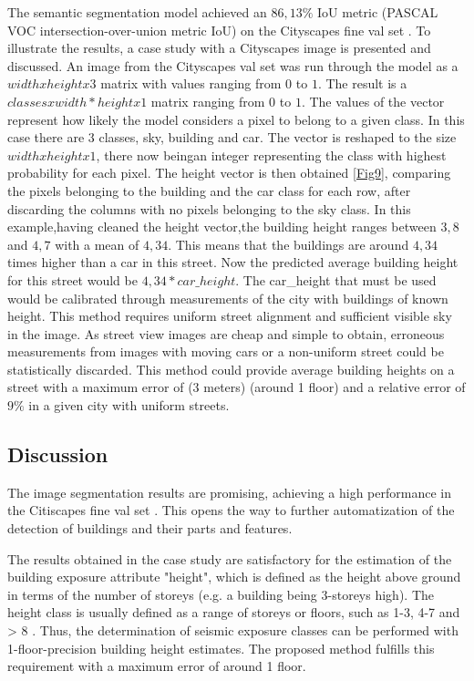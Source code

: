 \documentclass[journal,article,submit,pdftex,moreauthors]{Definitions/mdpi}
\begin{document}
The semantic segmentation model achieved an \(86,13 \% \) IoU metric (PASCAL VOC intersection-over-union metric IoU) on the Cityscapes fine val set \cite{Cordts2016TheUnderstanding}. To illustrate the results, a case study with a Cityscapes image is presented and discussed. An image from the Cityscapes val set was run through the model as a \(widthxheightx3\) matrix with values ranging from \(0\) to \(1\). The result is a \(classesxwidth*heightx1\)  matrix ranging from \(0\) to \(1\). The values of the vector represent how likely the model considers a pixel to belong to a given class. In this case there are \(3\) classes, sky, building and car. The vector is reshaped to the size \(widthxheightx1\), there now beingan integer representing the class with highest probability for each pixel. The height vector is then obtained \ref{Fig9}, comparing the pixels belonging to the building and the car class for each row, after discarding the columns with no pixels belonging to the sky class. In this example,having cleaned the height vector,the building height ranges between \(3,8\) and \(4,7\) with a mean of \(4,34\). This means that the buildings are around \(4,34\) times higher than a car in this street. Now the predicted average building height for this street would be \(4,34 * car\_height \). The car\_height that must be used would be calibrated through measurements of the city with buildings of known height. This method requires uniform street alignment and sufficient visible sky in the image. As street view images are cheap and simple to obtain, erroneous measurements from images with moving cars or a non-uniform street could be statistically discarded. This method could provide average building heights on a street with a maximum error of (\(3\) meters) (around 1 floor) and a relative error of \(9\%\) in a given city with uniform streets.

\subsection{Discussion}

The image segmentation results are promising, achieving a high performance in the Citiscapes fine val set \cite{Cordts2016TheUnderstanding}. This opens the way to further automatization of the detection of buildings and their parts and features.

The results obtained in the case study are satisfactory for the estimation of the building exposure attribute "height", which is defined as the height above ground in terms of the number of storeys (e.g. a building being 3-storeys high). The height class is usually defined as a range of storeys or floors, such as 1-3, 4-7 and > 8 \citep{FEMA2001HazusManual,BrzevGEMModelling}. Thus, the determination of seismic exposure classes can be performed with 1-floor-precision building height estimates. The proposed method fulfills this requirement with a maximum error of around 1 floor. 
\end{document}
